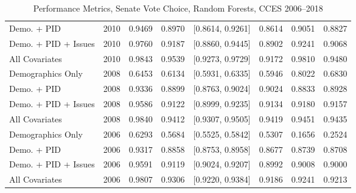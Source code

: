 \begin{table}[H]
\begin{tabular}{lrrrlrrr}
  Demo. + PID & 2010 & 0.9469 & 0.8970 & [0.8614, 0.9261] & 0.8614 & 0.9051 & 0.8827 \\ 
  Demo. + PID + Issues & 2010 & 0.9760 & 0.9187 & [0.8860, 0.9445] & 0.8902 & 0.9241 & 0.9068 \\ 
  All Covariates & 2010 & 0.9843 & 0.9539 & [0.9273, 0.9729] & 0.9172 & 0.9810 & 0.9480 \\ 
  Demographics Only & 2008 & 0.6453 & 0.6134 & [0.5931, 0.6335] & 0.5946 & 0.8022 & 0.6830 \\ 
  Demo. + PID & 2008 & 0.9336 & 0.8899 & [0.8763, 0.9024] & 0.9024 & 0.8833 & 0.8928 \\ 
  Demo. + PID + Issues & 2008 & 0.9586 & 0.9122 & [0.8999, 0.9235] & 0.9134 & 0.9180 & 0.9157 \\ 
  All Covariates & 2008 & 0.9840 & 0.9412 & [0.9307, 0.9505] & 0.9419 & 0.9451 & 0.9435 \\ 
  Demographics Only & 2006 & 0.6293 & 0.5684 & [0.5525, 0.5842] & 0.5307 & 0.1656 & 0.2524 \\ 
  Demo. + PID & 2006 & 0.9317 & 0.8858 & [0.8753, 0.8958] & 0.8677 & 0.8739 & 0.8708 \\ 
  Demo. + PID + Issues & 2006 & 0.9591 & 0.9119 & [0.9024, 0.9207] & 0.8992 & 0.9008 & 0.9000 \\ 
  All Covariates & 2006 & 0.9807 & 0.9306 & [0.9220, 0.9384] & 0.9186 & 0.9241 & 0.9213 \\ 
   \bottomrule
\end{tabular}
\caption{Performance Metrics, Senate Vote Choice, Random Forests, CCES 2006--2018} 
\label{tab:cces_senate_rf}
\end{table}
